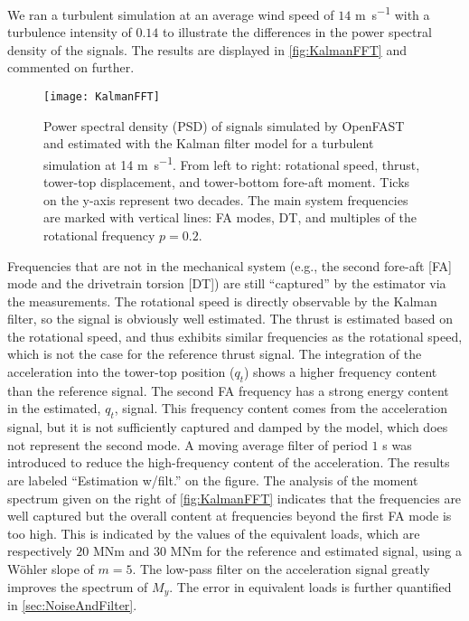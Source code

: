 \documentclass[wes, manuscript]{copernicus}
\begin{document}
We ran a turbulent simulation at an average wind speed of $14$ \unit{m~s^{-1}} with a turbulence intensity of $0.14$ to illustrate the differences in the power spectral density of the signals. 
The results are displayed in \autoref{fig:KalmanFFT} and commented on further.
%
\noindent\begin{figure}[!htb]\centering%
  \texttt{[image: KalmanFFT]}
  \caption{Power spectral density (PSD) of signals simulated by OpenFAST and estimated with the Kalman filter model for a turbulent simulation at 14 \unit{m~s^{-1}}. From left to right: rotational speed, thrust, tower-top displacement, and tower-bottom fore-aft moment. Ticks on the y-axis represent two decades. The main system frequencies are marked with vertical lines: FA modes, DT, and multiples of the rotational frequency $p=0.2$.}\label{fig:KalmanFFT}%
\end{figure}
%
Frequencies that are not in the mechanical system (e.g., the second fore-aft [FA] mode and the drivetrain torsion [DT]) are still ``captured'' by the estimator via the measurements.
The rotational speed is directly observable by the Kalman filter, so the signal is obviously well estimated.
The thrust is estimated based on the rotational speed, and thus exhibits similar frequencies as the rotational speed, which is not the case for the reference thrust signal.
% 
The integration of the acceleration into the tower-top position ($q_t$) shows a higher frequency content than the reference signal. The second FA frequency has a strong energy content in the estimated, $q_t$, signal. This frequency content comes from the acceleration signal, but it is not sufficiently captured and damped by the model, which does not represent the second mode.
A moving average filter of period $1$ \unit{s} was introduced to reduce the high-frequency content of the acceleration. The results are labeled ``Estimation w/filt.'' on the figure.
The analysis of the moment spectrum given on the right of \autoref{fig:KalmanFFT} indicates that the frequencies are well captured but the overall content at frequencies beyond the first FA mode is too high.
This is indicated by the values of the equivalent loads, which are respectively $20$ \unit{MNm} and $30$ \unit{MNm} for the reference and estimated signal, using a W{\"o}hler slope of $m=5$. 
The low-pass filter on the acceleration signal greatly improves the spectrum of $M_y$.
The error in equivalent loads is further quantified in \autoref{sec:NoiseAndFilter}.
\end{document}
